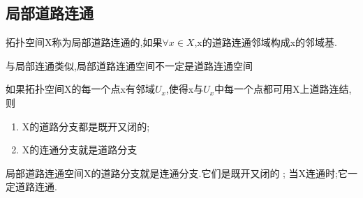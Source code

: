 \subsection*{局部道路连通}
\begin{definition}
    拓扑空间X称为局部道路连通的,如果\(\forall x \in X \),x的道路连通邻域构成x的邻域基.
\end{definition}
\begin{note}
    与局部连通类似,局部道路连通空间不一定是道路连通空间
\end{note}
\begin{lemma}
       如果拓扑空间X的每一个点x有邻域\(U_x\),使得x与\(U_x\)中每一个点都可用X上道路连结,则
       \begin{enumerate}
           \item X的道路分支都是既开又闭的; \\
           \item X的连通分支就是道路分支
       \end{enumerate}
\end{lemma}
\begin{theorem}
    局部道路连通空间X的道路分支就是连通分支.它们是既开又闭的 ; 当X连通时;它一定道路连通.
\end{theorem}
